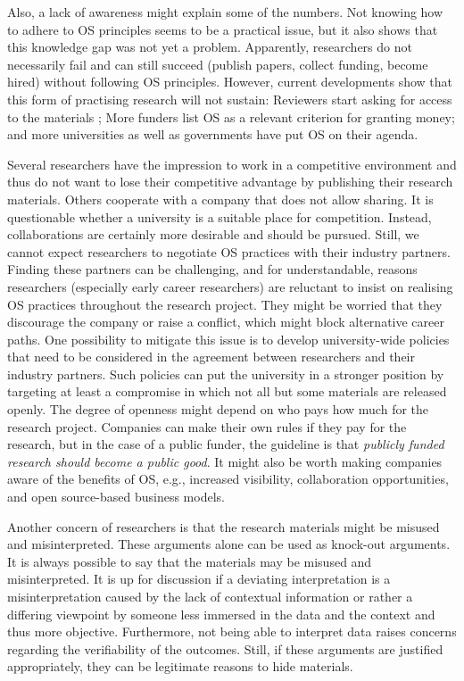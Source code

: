 \documentclass[gc, manuscript]{copernicus}
\begin{document}
Also, a lack of awareness might explain some of the numbers. Not knowing
how to adhere to OS principles seems to be a practical issue, but it
also shows that this knowledge gap was not yet a problem. Apparently,
researchers do not necessarily fail and can still succeed (publish
papers, collect funding, become hired) without following OS principles.
However, current developments show that this form of practising research
will not sustain: Reviewers start asking for access to the materials
\citep{stark2018before}; More funders list OS as a relevant criterion
for granting money; and more universities as well as governments have
put OS on their agenda.

Several researchers have the impression to work in a competitive
environment and thus do not want to lose their competitive advantage by
publishing their research materials. Others cooperate with a company
that does not allow sharing. It is questionable whether a university is
a suitable place for competition. Instead, collaborations are certainly
more desirable and should be pursued. Still, we cannot expect
researchers to negotiate OS practices with their industry partners.
Finding these partners can be challenging, and for understandable,
reasons researchers (especially early career researchers) are reluctant
to insist on realising OS practices throughout the research project.
They might be worried that they discourage the company or raise a
conflict, which might block alternative career paths. One possibility to
mitigate this issue is to develop university-wide policies that need to
be considered in the agreement between researchers and their industry
partners. Such policies can put the university in a stronger position by
targeting at least a compromise in which not all but some materials are
released openly. The degree of openness might depend on who pays how
much for the research project. Companies can make their own rules if
they pay for the research, but in the case of a public funder, the
guideline is that
\textit{publicly funded research should become a public good}. It might
also be worth making companies aware of the benefits of OS, e.g.,
increased visibility, collaboration opportunities, and open source-based
business models.

Another concern of researchers is that the research materials might be
misused and misinterpreted. These arguments alone can be used as
knock-out arguments. It is always possible to say that the materials may
be misused and misinterpreted. It is up for discussion if a deviating
interpretation is a misinterpretation caused by the lack of contextual
information or rather a differing viewpoint by someone less immersed in
the data and the context and thus more objective. Furthermore, not being
able to interpret data raises concerns regarding the verifiability of
the outcomes. Still, if these arguments are justified appropriately,
they can be legitimate reasons to hide materials.
\end{document}

